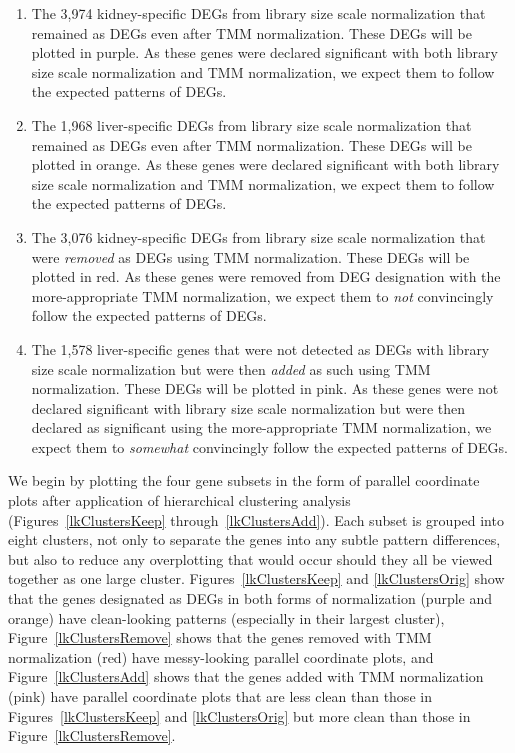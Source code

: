 \documentclass{bmcart}
\begin{document}
\begin{linenumbers}
\begin{doublespacing}
\begin{enumerate}

\item The 3,974 kidney-specific DEGs from library size scale normalization that remained as DEGs even after TMM normalization. These DEGs will be plotted in purple. As these genes were declared significant with both library size scale normalization and TMM normalization, we expect them to follow the expected patterns of DEGs.

\item The 1,968 liver-specific DEGs from library size scale normalization that remained as DEGs even after TMM normalization. These DEGs will be plotted in orange. As these genes were declared significant with both library size scale normalization and TMM normalization, we expect them to follow the expected patterns of DEGs.

\item The 3,076 kidney-specific DEGs from library size scale normalization that were \textit{removed} as DEGs using TMM normalization. These DEGs will be plotted in red. As these genes were removed from DEG designation with the more-appropriate TMM normalization, we expect them to \textit{not} convincingly follow the expected patterns of DEGs.

\item The 1,578 liver-specific genes that were not detected as DEGs with library size scale normalization but were then \textit{added} as such using TMM normalization. These DEGs will be plotted in pink. As these genes were not declared significant with library size scale normalization but were then declared as significant using the more-appropriate TMM normalization, we expect them to \textit{somewhat} convincingly follow the expected patterns of DEGs.

\end{enumerate}

We begin by plotting the four gene subsets in the form of parallel coordinate plots after application of hierarchical clustering analysis (Figures~\ref{lkClustersKeep} through~\ref{lkClustersAdd}). Each subset is grouped into eight clusters, not only to separate the genes into any subtle pattern differences, but also to reduce any overplotting that would occur should they all be viewed together as one large cluster. Figures~\ref{lkClustersKeep} and \ref{lkClustersOrig} show that the genes designated as DEGs in both forms of normalization (purple and orange) have clean-looking patterns (especially in their largest cluster), Figure~\ref{lkClustersRemove} shows that the genes removed with TMM normalization (red) have messy-looking parallel coordinate plots, and Figure~\ref{lkClustersAdd} shows that the genes added with TMM normalization (pink) have parallel coordinate plots that are less clean than those in Figures~\ref{lkClustersKeep} and \ref{lkClustersOrig} but more clean than those in Figure~\ref{lkClustersRemove}.


\end{doublespacing}
\end{linenumbers}
\end{document}
